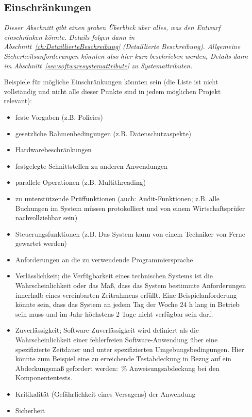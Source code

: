 \documentclass[fontsize=12pt,paper=a4,twoside]{scrartcl}
\begin{document}
\subsection{Einschränkungen}
\label{sec:Einschraenkungen}
{\em Dieser Abschnitt gibt einen groben Überblick über alles, was den
  Entwurf einschränken könnte. Details folgen dann in
  Abschnitt~\ref{ch:DetaillierteBeschreibung} (\glqq Detaillierte
  Beschreibung\grqq). Allgemeine Sicherheitsanforderungen könnten also
  hier kurz beschrieben werden, Details dann im
  Abschnitt~\ref{sec:softwaresystemattribute} zu Systemattributen.

  Beispiele für mögliche Einschränkungen könnten sein (die Liste ist
  nicht vollständig und nicht alle dieser Punkte sind in jedem
  möglichen Projekt relevant):

  \begin{itemize}
   \item feste Vorgaben (z.B. Policies)
   \item gesetzliche Rahmenbedingungen (z.B. Datenschutzaspekte)
   \item Hardwarebeschränkungen
   \item festgelegte Schnittstellen zu anderen Anwendungen
   \item parallele Operationen (z.B. Multithreading)
   \item zu unterstützende Prüffunktionen (auch: Audit-Funktionen;
     z.B. \glqq alle Buchungen im System müssen protokolliert und von
     einem Wirtschaftsprüfer nachvollziehbar sein\grqq)
   \item Steuerungsfunktionen (z.B. \glqq Das System kann von einem
     Techniker von Ferne gewartet werden\grqq)
   \item Anforderungen an die zu verwendende Programmiersprache
   \item Verlässlichkeit; die Verfügbarkeit eines technischen Systems 
       ist die Wahrscheinlichkeit oder das Maß, dass das System 
       bestimmte Anforderungen innerhalb eines vereinbarten
       Zeitrahmens erfüllt. Eine Beispielanforderung könnte sein, dass
       das System an jedem Tag der Woche 24 h lang in Betrieb sein 
       muss und im Jahr höchstens 2 Tage nicht verfügbar sein darf.
   \item Zuverlässigkeit; Software-Zuverlässigkeit wird definiert 
      als die Wahrscheinlichkeit einer fehlerfreien Software-Anwendung 
      über eine spezifizierte Zeitdauer und unter spezifizierten
      Umgebungsbedingungen. Hier könnte zum Beispiel eine zu
      erreichende Testabdeckung in Bezug auf ein Abdeckungsmaß
      gefordert werden: \,\% Anweisungsabdeckung bei den
      Komponententests\grqq.
   \item Kritikalität (Gefährlichkeit eines Versagens) der Anwendung
   \item Sicherheit
  \end{itemize}

}
\end{document}
